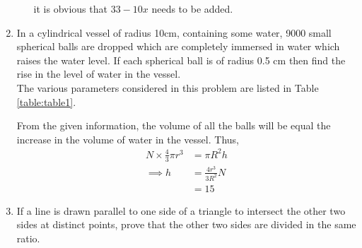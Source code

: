 \documentclass[journal,12pt,twocolumn]{IEEEtran}
\begin{document}
\begin{enumerate}[label=4.\arabic*]
\begin{enumerate}


it is obvious that $33-10x$ needs to be added.
    \end{enumerate}
    
    \item In a cylindrical vessel of radius 10cm, containing some water, 9000 small spherical balls are dropped which are completely immersed in water which raises the water level. If each spherical ball is of radius 0.5 cm then find the rise in the level of water in the vessel.\\
	    \solution The various parameters considered in this problem are listed in Table 
\eqref{table:table1}. 

\begin{table}[ht!]
	
\caption{}
\label{table:table1}	
\end{table}
From the given information, the volume of all the balls will be equal the increase in the volume of water in the vessel.  Thus, 
\begin{align}
	N \times \frac{4}{3}\pi r^3 &= \pi R^2 h
	\\
	\implies  h &=  \frac{4r^3}{3R^2}N
	\\
	&= 15
\end{align}
    
    \item If a line is drawn parallel to one side of a triangle to intersect the other two sides at distinct points, prove that the other two sides are divided in the same ratio.\\
\end{enumerate}
\end{document}
